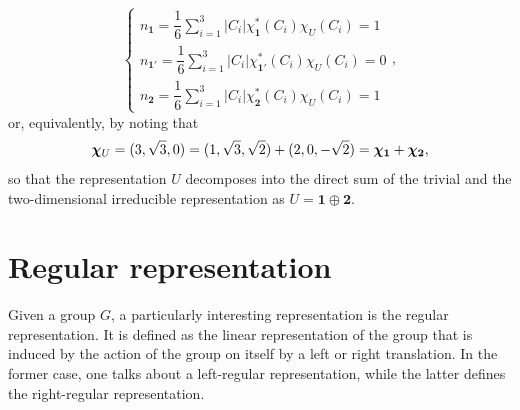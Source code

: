 \begin{ex}
    \begin{equation}
        \begin{cases}
            n_{\bm{1}} = \dfrac{1}{6} \displaystyle\sum_{i=1}^3 |C_i| \chi_{\bm{1}}^*(C_i) \chi_U(C_i) = 1 \\[2ex]
            n_{\bm{1'}} = \dfrac{1}{6} \displaystyle\sum_{i=1}^3 |C_i| \chi_{\bm{1'}}^*(C_i) \chi_U(C_i) = 0 \\[2ex]
            n_{\bm{2}} = \dfrac{1}{6} \displaystyle\sum_{i=1}^3 |C_i| \chi_{\bm{2}}^*(C_i) \chi_U(C_i) = 1
        \end{cases},
    \end{equation}
    or, equivalently, by noting that
    \begin{equation}
        \bm{\chi}_U = (3, \sqrt{3}, 0) = (1, \sqrt{3}, \sqrt{2}) + (2, 0, -\sqrt{2}) = \bm{\chi}_{\bm{1}} + \bm{\chi}_{\bm{2}},
    \end{equation}
    so that the representation $U$ decomposes into the direct sum of the trivial and the two-dimensional irreducible representation as $U = \bm{1} \oplus \bm{2}$.
\end{ex}

\section{Regular representation}
Given a group $G$, a particularly interesting representation is the regular representation. It is defined as the linear representation of the group that is induced by the action of the group on itself by a left or right translation. In the former case, one talks about a left-regular representation, while the latter defines the right-regular representation. 

